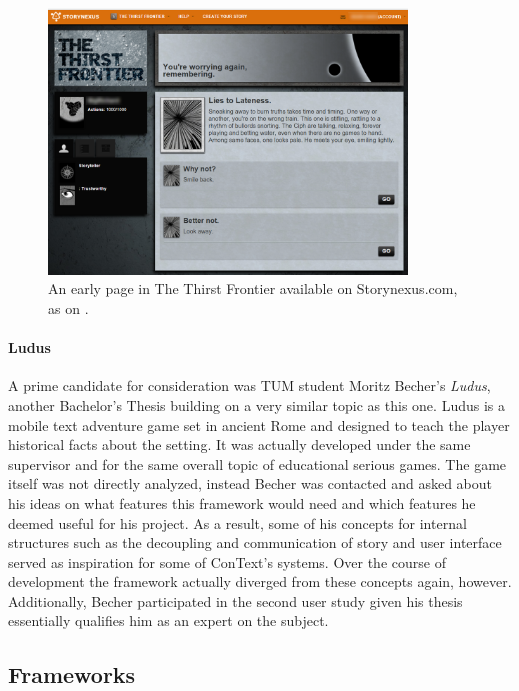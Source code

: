 \begin{figure}[!h]
\centering
\includegraphics[width=0.85\textwidth]{figures/storynexus.png}
\caption[Storynexus.com; The Thirst Frontier]{An early page in The Thirst Frontier available on Storynexus.com, as on \cite{SNEXTTF}.}\label{fig:storynexus}
\end{figure}

\paragraph{Ludus} 
A prime candidate for consideration was TUM student Moritz Becher's \textit{Ludus}, another Bachelor's Thesis building on a very similar topic as this one. Ludus is a mobile text adventure game set in ancient Rome and designed to teach the player historical facts about the setting. It was actually developed under the same supervisor and for the same overall topic of educational serious games. The game itself was not directly analyzed, instead Becher was contacted and asked about his ideas on what features this framework would need and which features he deemed useful for his project. As a result, some of his concepts for internal structures such as the decoupling and communication of story and user interface served as inspiration for some of ConText's systems. Over the course of development the framework actually diverged from these concepts again, however. Additionally, Becher participated in the second user study given his thesis essentially qualifies him as an expert on the subject. \cite{LUDUS}

\subsection{Frameworks}
